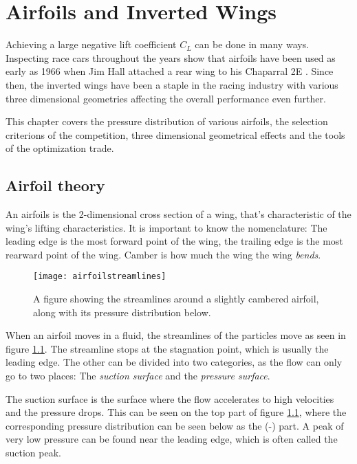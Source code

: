 \chapter{Airfoils and Inverted Wings}      

Achieving a large negative lift coefficient $C_L$ can be done in many ways. Inspecting race cars throughout the years show that airfoils have been used as early as 1966 when Jim Hall attached a rear wing to his Chaparral 2E \cite{hucho}. Since then, the inverted wings have been a staple in the racing industry with various three dimensional geometries affecting the overall performance even further.

This chapter covers the pressure distribution of various airfoils, the selection criterions of the competition, three dimensional geometrical effects and the tools of the optimization trade.

\section{Airfoil theory}

  An airfoils is the 2-dimensional cross section of a wing, that's characteristic of the wing's lifting characteristics. It is important to know the nomenclature: The leading edge is  the most forward point of the wing, the trailing edge is the most rearward point of the wing. Camber is how much the wing the wing \emph{bends}.

  \begin{figure}
    \texttt{[image: airfoilstreamlines]}
    \caption{A figure showing the streamlines around a slightly cambered airfoil, along with its pressure distribution below.}
    \label{fig:airfoilstreamlines}
  \end{figure}

  When an airfoil moves in a fluid, the streamlines of the particles move as seen in figure \ref{fig:airfoilstreamlines}. The streamline stops at the stagnation point, which is usually the leading edge. The other can be divided into two categories, as the flow can only go to two places: The \emph{suction surface} and the \emph{pressure surface}.

  The suction surface is the surface where the flow accelerates to high velocities and the pressure drops. This can be seen on the top part of figure \ref{fig:airfoilstreamlines}, where the corresponding pressure distribution can be seen below as the (-) part. A peak of very low pressure can be found near the leading edge, which is often called the suction peak.

